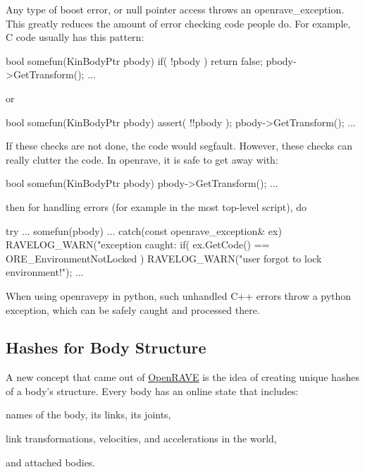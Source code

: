 Any type of boost error, or null pointer access throws an openrave\_\-exception. This greatly reduces the amount of error checking code people do. For example, C code usually has this pattern:


\begin{DoxyCode}
bool somefun(KinBodyPtr pbody)
{
    if( !pbody )
        return false;
    pbody->GetTransform();
    ...
}
\end{DoxyCode}


or


\begin{DoxyCode}
bool somefun(KinBodyPtr pbody)
{
    assert( !!pbody );
    pbody->GetTransform();
    ...
}
\end{DoxyCode}


If these checks are not done, the code would segfault. However, these checks can really clutter the code. In openrave, it is safe to get away with:


\begin{DoxyCode}
bool somefun(KinBodyPtr pbody)
{
    pbody->GetTransform();
    ...
}
\end{DoxyCode}


then for handling errors (for example in the most top-\/level script), do


\begin{DoxyCode}
try {
    ...
    somefun(pbody)
    ...
}
catch(const openrave_exception& ex) {
    RAVELOG_WARN("exception caught: %
    if( ex.GetCode() == ORE_EnvironmentNotLocked ) {
        RAVELOG_WARN("user forgot to lock environment!\n");
    }
    ...
}
\end{DoxyCode}


When using openravepy in python, such unhandled C++ errors throw a python exception, which can be safely caught and processed there.\hypertarget{architecture__concepts_arch_body_hashes}{}\subsection{Hashes for Body Structure}\label{architecture__concepts_arch_body_hashes}
A new concept that came out of \hyperlink{namespaceOpenRAVE}{OpenRAVE} is the idea of creating unique hashes of a body’s structure. Every body has an online state that includes:


\begin{DoxyItemize}
\item names of the body, its links, its joints,
\item link transformations, velocities, and accelerations in the world,
\item and attached bodies.
\end{DoxyItemize}


